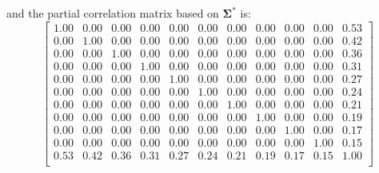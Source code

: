 \documentclass[a4paper]{article}
\def\sigb{{\boldsymbol{\Sigma}}}
\begin{document}
and the partial correlation matrix based on $\sigb^{*}$ is:
$$\begin{bmatrix}
1.00  & 0.00 & 0.00 & 0.00  & 0.00  &0.00 & 0.00  & 0.00 & 0.00  & 0.00 &   0.53\\
0.00 & 1.00 &  0.00 & 0.00 & 0.00&  0.00 &0.00 &0.00 &0.00 & 0.00&  0.42\\
0.00 & 0.00 &  1.00 & 0.00 & 0.00&  0.00 &0.00 &0.00 &0.00 & 0.00&  0.36\\
0.00 & 0.00 &  0.00 & 1.00 & 0.00&  0.00 &0.00 &0.00 &0.00 & 0.00&  0.31\\
0.00 & 0.00 &  0.00 & 0.00 & 1.00&  0.00 &0.00 &0.00 &0.00 & 0.00&  0.27\\
0.00 & 0.00 &  0.00 & 0.00 & 0.00&  1.00 &0.00 &0.00 &0.00 & 0.00&  0.24\\
0.00 & 0.00 &  0.00 & 0.00 & 0.00&  0.00 &1.00 &0.00 &0.00 & 0.00&  0.21\\
0.00 & 0.00 &  0.00 & 0.00 & 0.00&  0.00 &0.00 & 1.00 &0.00 & 0.00&  0.19\\
0.00 & 0.00 &  0.00 & 0.00 & 0.00&  0.00 &0.00 & 0.00 & 1.00 & 0.00&  0.17\\
0.00 & 0.00 &  0.00 & 0.00 & 0.00&  0.00 &0.00 & 0.00 & 0.00 & 1.00&  0.15\\
 0.53 & 0.42 &0.36 &0.31& 0.27& 0.24 &0.21& 0.19& 0.17 & 0.15  &1.00\\
\end{bmatrix}$$
\end{document}
